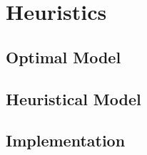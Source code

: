 \chapter{Heuristics}
\label{chp:heuristics}

\lipsum[1]


\section{Optimal Model}
\label{sec:optimal-model}

\lipsum[1]


\section{Heuristical Model}
\label{sec:heuristical-model}

\lipsum[1]


\section{Implementation}
\label{sec:implementation}